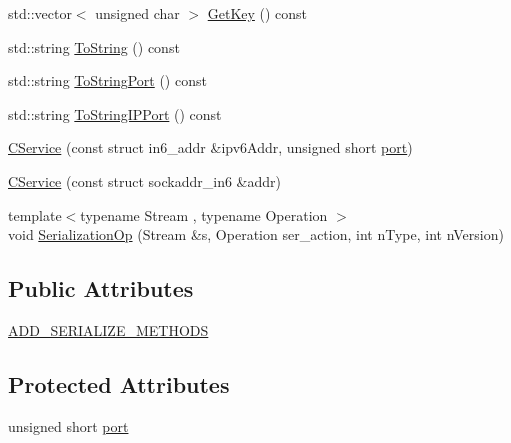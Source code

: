 \begin{DoxyCompactItemize}
\item 
std\+::vector$<$ unsigned char $>$ \hyperlink{class_c_service_a74d6e1526688229cb424584c29046e9e}{Get\+Key} () const 
\item 
std\+::string \hyperlink{class_c_service_a336f9848fe9364e260c76499be0351a5}{To\+String} () const 
\item 
std\+::string \hyperlink{class_c_service_a1e0f0b98239a9097044695a9e439bb46}{To\+String\+Port} () const 
\item 
std\+::string \hyperlink{class_c_service_a39b82301356b0dfc2a92befc727b77be}{To\+String\+I\+P\+Port} () const 
\item 
\hyperlink{class_c_service_a92fd246e176f01266cb36beae0c8f4fe}{C\+Service} (const struct in6\+\_\+addr \&ipv6\+Addr, unsigned short \hyperlink{class_c_service_aef17734203dc2125cbdf4d23e50be410}{port})
\item 
\hyperlink{class_c_service_ac0eb3107507be78cc683e7a7fa8d56e4}{C\+Service} (const struct sockaddr\+\_\+in6 \&addr)
\item 
{\footnotesize template$<$typename Stream , typename Operation $>$ }\\void \hyperlink{class_c_service_a0673ebec7bdc8558ce3fe1d63ea4d2e1}{Serialization\+Op} (Stream \&s, Operation ser\+\_\+action, int n\+Type, int n\+Version)
\end{DoxyCompactItemize}
\subsection*{Public Attributes}
\begin{DoxyCompactItemize}
\item 
\hyperlink{class_c_service_a3347aa84bd8f98ae853307ad4e47a4f5}{A\+D\+D\+\_\+\+S\+E\+R\+I\+A\+L\+I\+Z\+E\+\_\+\+M\+E\+T\+H\+O\+D\+S}
\end{DoxyCompactItemize}
\subsection*{Protected Attributes}
\begin{DoxyCompactItemize}
\item 
unsigned short \hyperlink{class_c_service_aef17734203dc2125cbdf4d23e50be410}{port}
\end{DoxyCompactItemize}
